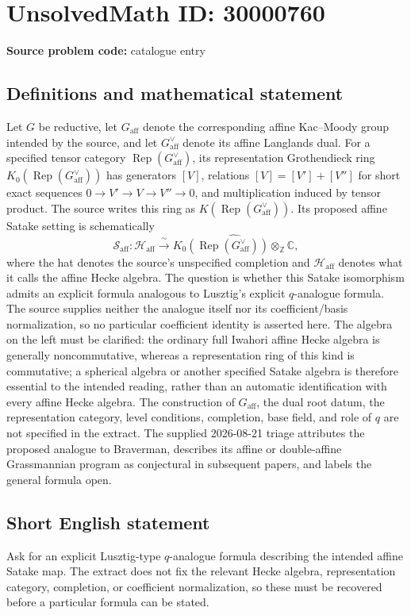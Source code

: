 \documentclass[11pt]{article}
\newcommand{\Z}{\mathbb{Z}}
\newcommand{\C}{\mathbb{C}}
\begin{document}
\section*{UnsolvedMath ID: 30000760}
\textbf{Source problem code:} catalogue entry
\subsection{Definitions and mathematical statement}
Let $G$ be reductive, let $G_{\mathrm{aff}}$ denote the corresponding affine Kac--Moody group intended by the source, and let $G_{\mathrm{aff}}^\vee$ denote its affine Langlands dual. For a specified tensor category $\operatorname{Rep}(G_{\mathrm{aff}}^\vee)$, its representation Grothendieck ring $K_0(\operatorname{Rep}(G_{\mathrm{aff}}^\vee))$ has generators $[V]$, relations $[V]=[V']+[V'']$ for short exact sequences $0\to V'\to V\to V''\to0$, and multiplication induced by tensor product. The source writes this ring as $K(\operatorname{Rep}(G_{\mathrm{aff}}^\vee))$. Its proposed affine Satake setting is schematically \[\mathcal S_{\mathrm{aff}}:\mathcal H_{\mathrm{aff}}\xrightarrow{\ \sim\ }\widehat{K_0(\operatorname{Rep}(G_{\mathrm{aff}}^\vee))\otimes_{\Z}\C},\] where the hat denotes the source's unspecified completion and $\mathcal H_{\mathrm{aff}}$ denotes what it calls the affine Hecke algebra. The question is whether this Satake isomorphism admits an explicit formula analogous to Lusztig's explicit $q$-analogue formula. The source supplies neither the analogue itself nor its coefficient/basis normalization, so no particular coefficient identity is asserted here. The algebra on the left must be clarified: the ordinary full Iwahori affine Hecke algebra is generally noncommutative, whereas a representation ring of this kind is commutative; a spherical algebra or another specified Satake algebra is therefore essential to the intended reading, rather than an automatic identification with every affine Hecke algebra. The construction of $G_{\mathrm{aff}}$, the dual root datum, the representation category, level conditions, completion, base field, and role of $q$ are not specified in the extract. The supplied 2026-08-21 triage attributes the proposed analogue to Braverman, describes its affine or double-affine Grassmannian program as conjectural in subsequent papers, and labels the general formula open.
\subsection{Short English statement}
Ask for an explicit Lusztig-type $q$-analogue formula describing the intended affine Satake map. The extract does not fix the relevant Hecke algebra, representation category, completion, or coefficient normalization, so these must be recovered before a particular formula can be stated.
\end{document}
